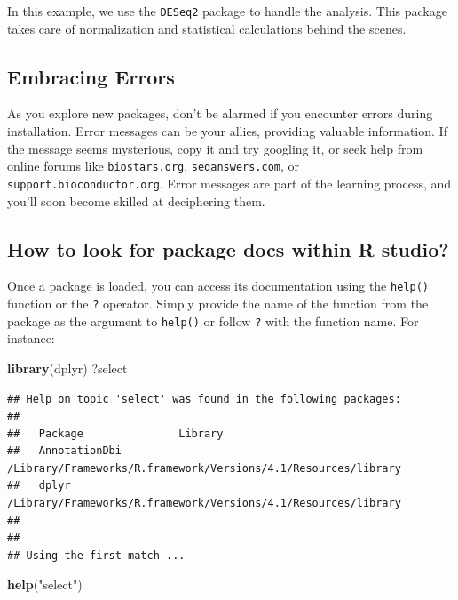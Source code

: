 \documentclass[
]{book}
\newenvironment{Shaded}{\begin{snugshade}}{\end{snugshade}}
\newcommand{\FunctionTok}[1]{\textcolor[rgb]{0.13,0.29,0.53}{\textbf{#1}}}
\newcommand{\NormalTok}[1]{#1}
\newcommand{\StringTok}[1]{\textcolor[rgb]{0.31,0.60,0.02}{#1}}
\begin{document}
In this example, we use the \texttt{DESeq2} package to handle the analysis. This package takes care of normalization and statistical calculations behind the scenes.

\hypertarget{embracing-errors}{%
\subsection{Embracing Errors}\label{embracing-errors}}

As you explore new packages, don't be alarmed if you encounter errors during installation. Error messages can be your allies, providing valuable information. If the message seems mysterious, copy it and try googling it, or seek help from online forums like \texttt{biostars.org}, \texttt{seqanswers.com}, or \texttt{support.bioconductor.org}. Error messages are part of the learning process, and you'll soon become skilled at deciphering them.

\hypertarget{how-to-look-for-package-docs-within-r-studio}{%
\subsection{How to look for package docs within R studio?}\label{how-to-look-for-package-docs-within-r-studio}}

Once a package is loaded, you can access its documentation using the \texttt{help()} function or the \texttt{?} operator. Simply provide the name of the function from the package as the argument to \texttt{help()} or follow \texttt{?} with the function name. For instance:

\begin{Shaded}
\begin{Highlighting}[]
\FunctionTok{library}\NormalTok{(dplyr)}
\NormalTok{?select}
\end{Highlighting}
\end{Shaded}

\begin{verbatim}
## Help on topic 'select' was found in the following packages:
## 
##   Package               Library
##   AnnotationDbi         /Library/Frameworks/R.framework/Versions/4.1/Resources/library
##   dplyr                 /Library/Frameworks/R.framework/Versions/4.1/Resources/library
## 
## 
## Using the first match ...
\end{verbatim}

\begin{Shaded}
\begin{Highlighting}[]
\FunctionTok{help}\NormalTok{(}\StringTok{"select"}\NormalTok{)}
\end{Highlighting}
\end{Shaded}
\end{document}
